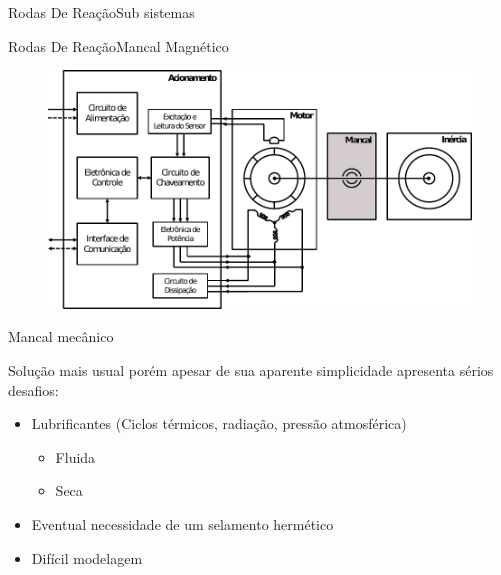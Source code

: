 \documentclass{beamer}
\begin{document}
\begin{frame}{Rodas De Reação}{Sub sistemas}

\end{frame}

\begin{frame}{Rodas De Reação}{Mancal Magnético}

\begin{figure}
\centering
\includegraphics[width=1\linewidth]{../../Dissertacao/Figs/EsquemaRoda_destaque}
\end{figure}

\end{frame}



\begin{frame}{Mancal mecânico}
	
	Solução mais usual porém apesar de sua aparente simplicidade apresenta sérios desafios:

	\begin{itemize}
		\item Lubrificantes (Ciclos térmicos, radiação, pressão atmosférica)	
		\begin{itemize}
			\item Fluida
			\item Seca
		\end{itemize}
		\item Eventual necessidade de um selamento hermético 
		\item Difícil modelagem
	\end{itemize}
	
\end{frame}
\end{document}
